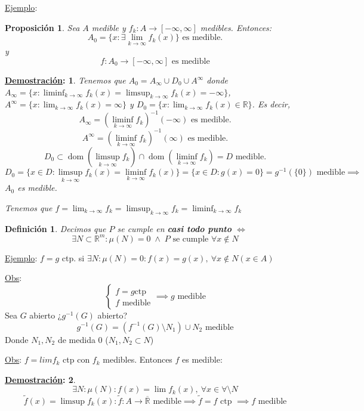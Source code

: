\documentclass[10pt,a4paper,openright]{book}
\theoremstyle{break}
\newtheorem*{defi}{Definición}
\newtheorem*{prop}{Proposición}
\newtheorem*{demo}{\underline{Demostración}:}
\DeclareMathOperator{\dom}{dom}
\begin{document}
\underline{Ejemplo}: 

\begin{prop}
Sea $A$ medible y $f_k: A \to \left[-\infty, \infty\right]$ medibles. Entonces: $$A_0 = \{x : \exists \lim_{k \to \infty}f_k\left(x\right)\}\text{ es medible.}$$ 
y 
$$f: A_0 \to \left[-\infty, \infty\right] \text{ es medible}$$
\end{prop}
\begin{demo}
Tenemos que $A_0 = A_{\infty} \cup D_0 \cup A^{\infty}$ donde $A_{\infty} = \{x: \liminf_{k \to \infty}f_k\left(x\right) = \limsup_{k \to \infty}f_k\left(x\right) = -\infty\}$, $A^{\infty} = \{x: \lim_{k \to \infty}f_k\left(x\right) = \infty\}$ y $D_0 = \{x: \lim_{k \to \infty}f_k\left(x\right) \in \mathbb{R}\}$. Es decir,
$$A_{\infty} = \left(\liminf_{k \to \infty}f_k \right)^{-1}\left(-\infty\right) \text{ es medible.}$$
$$A^{\infty} = \left(\liminf_{k \to \infty}f_k \right)^{-1}\left(\infty\right) \text{ es medible.}$$
$$D_0 \subset \dom\left(\limsup_{k \to \infty}f_k\right) \cap \dom\left(\liminf_{k \to \infty}f_k\right) = D \text{ medible.}$$
$$D_0 = \{x \in D: \limsup_{k \to \infty}f_k\left(x\right) = \liminf_{k \to \infty}f_k\left(x\right)\} = \{x \in D: g\left(x\right) = 0\} = g^{-1}\left(\{0\}\right) \text{ medible} \implies$$
$A_0$ es medible.

Tenemos que $f = \lim_{k \to \infty}f_k= \limsup_{k \to \infty}f_k = \liminf_{k \to \infty}f_k$
\end{demo}

\begin{defi}
Decimos que $P$ se cumple en \textbf{casi todo punto} $\iff$
$$\exists N \subset \mathbb{R}^m: \mu\left(N\right) = 0\; \land \;P \text{ se cumple } \forall x \not\in N$$
\end{defi}

\underline{Ejemplo}:
$f = g$ ctp. si $\exists N: \mu\left(N\right) = 0: f\left(x\right) = g\left(x\right),\ \forall x \not\in N \left(x \in A\right)$

\underline{Obs}:
$$\begin{cases}
    f = g \text{ctp}\\
    f \text{ medible}
\end{cases} \implies g \text{ medible}$$
Sea $G$ abierto ¿$g^{-1}\left(G\right)$ abierto?
$$g^{-1}\left(G\right) = \left(f^{-1}\left(G\right) \setminus N_1\right) \cup N_2 \text{ medible}$$
Donde $N_1, N_2$ de medida $0$ ($N_1, N_2 \subset N$)

\underline{Obs}:
$f = lim f_k$  ctp con $f_k$ medibles. Entonces $f$ es medible:
\begin{demo}
$$\exists N: \mu\left(N\right) : f\left(x\right) = \lim f_k\left(x\right),\ \forall x \in \forall \setminus N$$
$$\tilde{f}\left(x\right) = \limsup f_k\left(x\right): \tilde{f}: A \to \overline{\mathbb{R}} \text{ medible} \implies \tilde{f} = f \text{ ctp } \implies f \text{ medible}$$
\end{demo}
\end{document}
